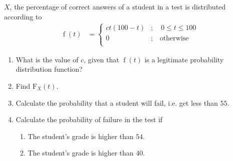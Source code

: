 \documentclass[fleqn, a4paper, 11pt, oneside]{amsart}
\theoremstyle{definition}
\theoremstyle{theorem}
\DeclareMathOperator{\pdf}{\mathrm{f}}
\newcommand*{\cdf}[1]{\mathrm{F}_{#1}}
\begin{document}
\begin{question}
	$X$, the percentage of correct answers of a student in a test is distributed according to
	\begin{align*}
		\pdf(t) &=
			\begin{cases}
				c t (100 - t) &;\quad 0 \le t \le 100\\
				0 &;\quad \text{otherwise}\\
			\end{cases}
	\end{align*}
	\begin{enumerate}
		\item
			What is the value of $c$, given that $\pdf(t)$ is a legitimate probability distribution function?
		\item
			Find $\cdf{X}(t)$.
		\item
			Calculate the probability that a student will fail, i.e. get less than $55$.
		\item
			Calculate the probability of failure in the test if
			\begin{enumerate}
				\item The student's grade is higher than $54$.
				\item The student's grade is higher than $40$.
			\end{enumerate}
	\end{enumerate}
\end{question}
\end{document}
